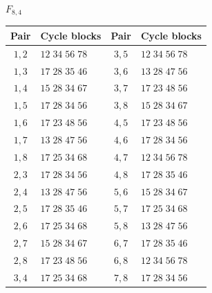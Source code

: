 \documentclass[11pt,a4paper]{article}
\theoremstyle{plain}
\theoremstyle{definition}
\numberwithin{equation}{section}
\begin{document}
\begin{center}\small
$F_{8,4}$\par\nopagebreak[4]\smallskip\nopagebreak[4]
\begin{tabular}{cl@{\qquad}cl}\toprule Pair&Cycle blocks&Pair&Cycle blocks\\\midrule
$1,2$ & $12\;34\;56\;78$ & $3,5$ & $12\;34\;56\;78$ \\
$1,3$ & $17\;28\;35\;46$ & $3,6$ & $13\;28\;47\;56$ \\
$1,4$ & $15\;28\;34\;67$ & $3,7$ & $17\;23\;48\;56$ \\
$1,5$ & $17\;28\;34\;56$ & $3,8$ & $15\;28\;34\;67$ \\
$1,6$ & $17\;23\;48\;56$ & $4,5$ & $17\;23\;48\;56$ \\
$1,7$ & $13\;28\;47\;56$ & $4,6$ & $17\;28\;34\;56$ \\
$1,8$ & $17\;25\;34\;68$ & $4,7$ & $12\;34\;56\;78$ \\
$2,3$ & $17\;28\;34\;56$ & $4,8$ & $17\;28\;35\;46$ \\
$2,4$ & $13\;28\;47\;56$ & $5,6$ & $15\;28\;34\;67$ \\
$2,5$ & $17\;28\;35\;46$ & $5,7$ & $17\;25\;34\;68$ \\
$2,6$ & $17\;25\;34\;68$ & $5,8$ & $13\;28\;47\;56$ \\
$2,7$ & $15\;28\;34\;67$ & $6,7$ & $17\;28\;35\;46$ \\
$2,8$ & $17\;23\;48\;56$ & $6,8$ & $12\;34\;56\;78$ \\
$3,4$ & $17\;25\;34\;68$ & $7,8$ & $17\;28\;34\;56$ \\
\bottomrule\end{tabular}
\end{center}
\end{document}
